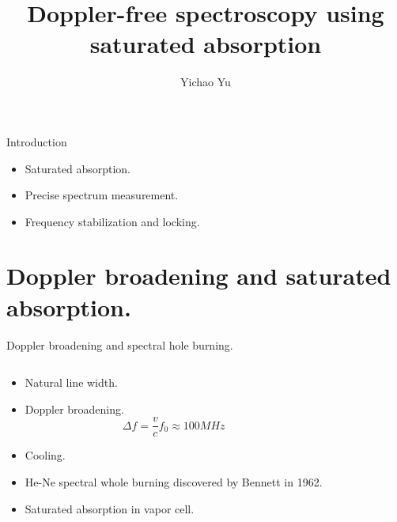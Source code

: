 \documentclass{beamer}
\title[Doppler-free spectroscopy\hspace{2em}\tiny{\timeleft}]{Doppler-free spectroscopy using saturated absorption}
\author{Yichao Yu}
\institute{MIT}
\def\timeleft{15:00->14:55}
\begin{document}
\begin{frame}{}
  \titlepage
\end{frame}

\def\timeleft{14:55->14:20}
\begin{frame}{Introduction}
  \begin{block}{}
    \begin{itemize}[<+->]
    \item
      Saturated absorption.
    \item
      Precise spectrum measurement.
    \item
      Frequency stabilization and locking.
    \end{itemize}
  \end{block}
\end{frame}

\def\timeleft{14:20->13:50}
\begin{frame}
  \tableofcontents
\end{frame}

\def\timeleft{13:50->11:40}
\section{Doppler broadening and saturated absorption.}
\begin{frame}{Doppler broadening and spectral hole burning.}
  \begin{columns}
    \column{6cm}
    \begin{block}{}
      \begin{itemize}[<+->]
      \item
        Natural line width.
      \item
        Doppler broadening.
        \[ \Delta f=\frac{v}{c}f_0\approx100MHz \]
      \item
        Cooling.
      \item
        He-Ne spectral whole burning discovered by Bennett in 1962.\only<+->{}
      \item
        Saturated absorption in vapor cell.
      \end{itemize}
    \end{block}
    \column{6cm}
     {
    }
  \end{columns}
\end{frame}
\end{document}
